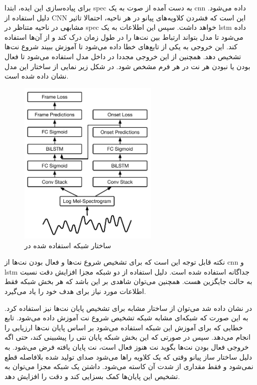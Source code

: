 برای پیاده‌سازی این ایده، ابتدا \gls{spec} به دست آمده از صوت به یک \gls{cnn}
داده می‌شود. دلیل استفاده از \gls{CNN} این است که فشردن کلاویه‌های پیانو در هر
ناحیه، احتمالا تاثیر مشابهی در ناحیه متناظر در \gls{spec} خواهد داشت. سپس این
اطلاعات به یک \gls{lstm} داده می‌شود تا مدل بتواند ارتباط بین نت‌ها را در طول
زمان درک کند و از آن‌ها استفاده کند. این خروجی به یکی از تابع‌های خطا داده
می‌شود تا آموزش ببیند شروع نت‌ها تشخیص دهد. همچنین از این خروجی مجددا در داخل
مدل استفاده می‌شود تا فعال بودن یا نبودن هر نت در هر فرم مشخص شود. در شکل زیر
نمایی از ساختار این مدل نشان داده شده است.
\begin{figure}[ht]
    \centering
    \includegraphics[height=8cm]{./statics/onset_onframe_architecture.png}
    \caption{ساختار شبکه استفاده شده در \cite{hawthorne2017onsets}}
\end{figure}

نکته قابل توجه این است که برای تشخیص شروع نت‌ها و فعال بودن نت‌ها از \gls{cnn} و
\gls{lstm} جداگانه استفاده شده است. دلیل استفاده از دو شبکه مجزا افزایش دقت نسبت
به حالت جایگزین هست. همچنین می‌توان شاهدی بر این باشد که هر بخش شبکه فقط اطلاعات
مورد نیاز برای هدف خود را یاد می‌گیرد.

در \cite{hawthorne2018enabling} نشان داده شد می‌توان از ساختار مشابه برای تشخیص
پایان نت‌ها نیز استفاده کرد. به این صورت که شبکه‌ای مشابه شبکه‌ تشخیص شروع نت
آموزش داده می‌شود. تابع خطایی که برای آموزش این شبکه استفاده می‌شود بر اساس
پایان نت‌ها ارزیابی را انجام می‌دهد. سپس در صورتی که این بخش شبکه پایان نتی را
پیشبینی کند، حتی اگه خروجی فعال بودن نت‌ها بگوید نت هنوز فعال است، نت پایان
یافته فرض می‌شود. به دلیل ساختار ساز پیانو وقتی که یک کلاویه راها می‌شود صدای
تولید شده بلافاصله قطع نمی‌شود و فقط مقداری از شدت آن کاسته می‌شود. داشتن یک
شبکه مجزا می‌توان به تشخیص این پایان‌ها کمک بسزایی کند و دقت را افزایش دهد.

